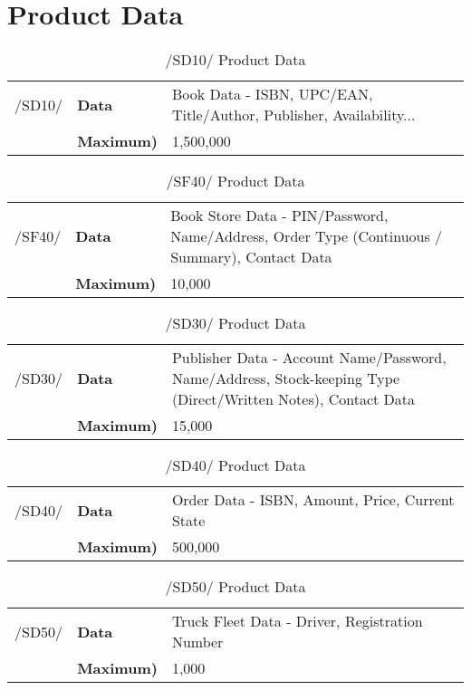 \documentclass[11pt,a4paper,oneside,svgnames]{report}
\begin{document}
\chapter{Product Data}

\begin{table}[H]
\centering
\begin{tabular}{p{1.5cm}p{3cm}p{8cm}}
\cellcolor{white}/SD10/	& \textbf{Data}	& Book Data - ISBN, UPC/EAN, Title/Author, Publisher, Availability... \\
\cellcolor{white}	 & \textbf{Maximum)} &  1,500,000\\
\end{tabular}
\caption{/SD10/ Product Data }
\end{table}

\begin{table}[H]
\centering
\begin{tabular}{p{1.5cm}p{3cm}p{8cm}}
\cellcolor{white}/SF40/	& \textbf{Data}	&  Book Store Data - PIN/Password, Name/Address, Order Type (Continuous / Summary), Contact Data \\
\cellcolor{white}		& \textbf{Maximum)} &  10,000\\
\end{tabular}
\caption{/SF40/ Product Data}
\end{table}

\begin{table}[H]
\centering
\begin{tabular}{p{1.5cm}p{3cm}p{8cm}}
\cellcolor{white}/SD30/	& \textbf{Data}	& Publisher Data - Account Name/Password, Name/Address, Stock-keeping Type (Direct/Written Notes), Contact Data \\
\cellcolor{white}		& \textbf{Maximum)} & 15,000 \\
\end{tabular}
\caption{/SD30/ Product Data}
\end{table}

\begin{table}[H]
\centering
\begin{tabular}{p{1.5cm}p{3cm}p{8cm}}
\cellcolor{white}/SD40/	& \textbf{Data}	& Order Data - ISBN, Amount, Price, Current State\\
\cellcolor{white}		& \textbf{Maximum)} & 500,000 \\
\end{tabular}
\caption{/SD40/ Product Data}
\end{table}

\begin{table}[H]
\centering
\begin{tabular}{p{1.5cm}p{3cm}p{8cm}}
\cellcolor{white}/SD50/	& \textbf{Data}	& Truck Fleet Data - Driver, Registration Number \\
\cellcolor{white}		& \textbf{Maximum)} &  1,000 \\
\end{tabular}
\caption{/SD50/ Product Data}
\end{table}
\end{document}
